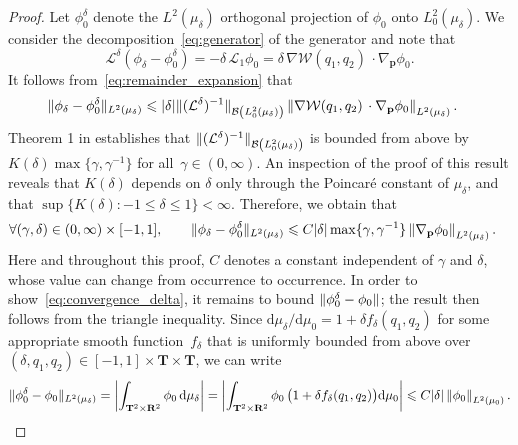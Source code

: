 \documentclass[11pt,a4paper]{article}
\newcommand{\real}{\mathbf R}
\newcommand{\torus}{\mathbf T}
\newcommand{\grad}{\nabla}
\newcommand{\vect}[1]{\boldsymbol{\mathbf #1}}
\renewcommand{\d}{\mathrm d}
\theoremstyle{plain}
\numberwithin{equation}{section}
\renewcommand{\leq}{\leqslant}
\begin{document}
\begin{proof}
    Let $\phi_0^{\delta}$ denote the $L^2(\mu_{\delta})$ orthogonal projection of $\phi_0$ onto $L^2_0(\mu_{\delta})$.
    We consider the decomposition~\eqref{eq:generator} of the generator and note that
    \begin{equation}
        \label{eq:remainder_expansion}
        \mathcal L^{\delta}(\phi_\delta - \phi_0^{\delta})
        = - \delta \, \mathcal L_1 \phi_0
        = \delta \, \grad \mathcal W(q_1, q_2) \, \cdot \grad_{\vect p} \phi_0.
    \end{equation}
    It follows from~\eqref{eq:remainder_expansion} that
     \begin{align*}
         \norm*{\phi_\delta - \phi_0^{\delta}}[L^2(\mu_{\delta})]
         &\leq \lvert \delta \rvert \norm*{(\mathcal L^{\delta})^{-1}} [\mathcal B\left(L^2_0(\mu_{\delta})\right)]
         \norm{\grad \mathcal W(q_1, q_2) \, \cdot \grad_{\vect p} \phi_0}[L^2(\mu_{\delta})].
     \end{align*}
     Theorem 1 in \cite{roussel2018spectral} establishes that $\norm*{(\mathcal L^{\delta})^{-1}}[\mathcal B \left( L^2_{0}(\mu_{\delta})\right)] $ is bounded from above by $K(\delta) \max\{\gamma, \gamma^{-1}\}$ for all~$\gamma \in (0, \infty)$.
     An inspection of the proof of this result reveals that $K(\delta)$ depends on $\delta$ only through the Poincaré constant of $\mu_{\delta}$,
     and that $\sup \{K(\delta): -1 \leq \delta \leq 1\} < \infty$.
     Therefore, we obtain that
     \begin{align}
         \label{eq:convergence_l2}
         \forall (\gamma, \delta) \in (0, \infty) \times [-1, 1], \qquad
         \norm*{\phi_\delta - \phi_0^{\delta}}[L^2(\mu_{\delta})]
         &\leq C \lvert \delta \rvert \max\{\gamma, \gamma^{-1}\}
         \norm{\grad_{\vect p} \phi_0}[L^2(\mu_{\delta})].
     \end{align}
    Here and throughout this proof, $C$ denotes a constant independent of $\gamma$ and $\delta$,
    whose value can change from occurrence to occurrence.
    In order to show~\eqref{eq:convergence_delta},
    it remains to bound $\norm*{\phi_0^{\delta}- \phi_0}$;
    the result then follows from the triangle inequality.
    Since
    \(
        \d \mu_{\delta} / \d \mu_0  = 1 + \delta f_{\delta}(q_1, q_2)
    \)
    for some appropriate smooth function~$f_{\delta}$ that is uniformly bounded from above over $(\delta, q_1, q_2) \in [-1, 1] \times \torus \times \torus$,
    we can write
    \[
        \norm*{\phi_0^\delta - \phi_0} [L^2(\mu_\delta)]
        = \abs{ \int_{\torus^2 \times \real^2} \phi_0 \, \d \mu_{\delta} }
        = \abs{ \int_{\torus^2 \times \real^2} \phi_0 \,\bigl( 1 + \delta f_{\delta}(q_1, q_2) \bigr)\d \mu_{0}}
        \leq C \lvert \delta \rvert \norm{\phi_0}[L^2(\mu_0)].
    \]


\end{proof}
\end{document}
